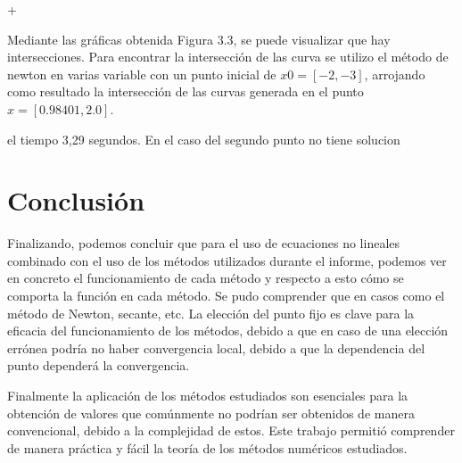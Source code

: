 +\documentclass{udpreport}
\begin{document}
\begin{enumerate}
            
            Mediante las gráficas obtenida Figura 3.3, se puede visualizar que hay  intersecciones. Para encontrar la intersección de las curva se utilizo el método de newton en varias variable con un punto inicial de $x0=[-2,-3]$, arrojando como resultado la intersección de las curvas generada en el punto $x=[0.98401,2.0]$.\par el tiempo 3,29 segundos. En el caso del segundo punto no tiene solucion

        
           \end{enumerate}
    \newpage

    \chapter{Conclusión}
    
   Finalizando, podemos concluir que para el uso de ecuaciones no lineales  combinado con el uso de los métodos utilizados durante el informe, podemos ver en concreto el funcionamiento de cada método y respecto a esto cómo se comporta la función en cada método. Se pudo comprender que en casos como el método de Newton, secante, etc. La elección del punto fijo es clave para la eficacia del funcionamiento de los métodos, debido a que en caso de una elección errónea podría no haber convergencia local, debido a que la dependencia del punto dependerá la convergencia. 
   
   Finalmente la aplicación de los métodos estudiados son esenciales para la obtención de valores que comúnmente no podrían ser obtenidos de manera convencional, debido a la complejidad de estos. Este trabajo permitió comprender de manera práctica y fácil la teoría de los métodos numéricos estudiados.
      
\end{document}
